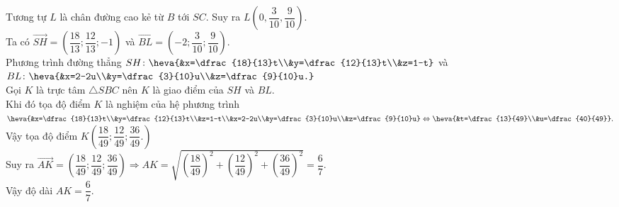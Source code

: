 \begin{bt}
{		Tương tự $L$ là chân đường cao kẻ từ $B$ tới $SC$. Suy ra $L\left(0, \dfrac{3}{10}, \dfrac{9}{10}\right)$.\\
		Ta có $\vec{SH}=\left(\dfrac{18}{13};\dfrac{12}{13}; -1\right)$ và $\vec{BL}=\left(-2;\dfrac{3}{10};\dfrac{9}{10}\right) $.\\
		Phương trình đường thẳng $SH\colon\heva{&x=\dfrac{18}{13}t\\&y=\dfrac{12}{13}t\\&z=1-t}$ và $BL\colon \heva{&x=2-2u\\&y=\dfrac{3}{10}u\\&z=\dfrac{9}{10}u.}$\\
		Gọi $K$ là trực tâm $\triangle SBC$ nên $K$ là giao điểm của $SH$ và $BL$.\\
		Khi đó tọa độ điểm $K$ là nghiệm của hệ phương trình $\heva{&x=\dfrac{18}{13}t\\&y=\dfrac{12}{13}t\\&z=1-t\\&x=2-2u\\&y=\dfrac{3}{10}u\\&z=\dfrac{9}{10}u}\Leftrightarrow \heva{&t=\dfrac{13}{49}\\&u=\dfrac{40}{49}}.$\\
		Vậy tọa độ điểm $K\left(\dfrac{18}{49};\dfrac{12}{49};\dfrac{36}{49}.\right)$\\
		Suy ra $\vec{AK}=\left(\dfrac{18}{49};\dfrac{12}{49};\dfrac{36}{49}\right)\Rightarrow AK=\sqrt{\left(\dfrac{18}{49}\right)^2 + \left(\dfrac{12}{49}\right)^2 + \left(\dfrac{36}{49}\right)^2}=\dfrac{6}{7}$.\\
		Vậy độ dài $AK = \dfrac{6}{7}$.
	}
	
\end{bt}

